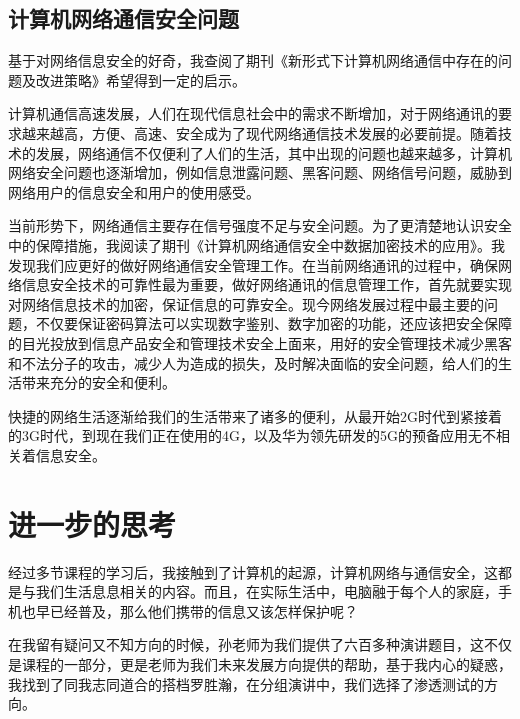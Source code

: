 \documentclass{article}
\begin{document}
\subsection{计算机网络通信安全问题}
基于对网络信息安全的好奇，我查阅了期刊《新形式下计算机网络通信中存在的问题及改进策略》\citep{A}希望得到一定的启示。\par
计算机通信高速发展，人们在现代信息社会中的需求不断增加，对于网络通讯的要求越来越高，方便、高速、安全成为了现代网络通信技术发展的必要前提。随着技术的发展，网络通信不仅便利了人们的生活，其中出现的问题也越来越多，计算机网络安全问题也逐渐增加，例如信息泄露问题、黑客问题、网络信号问题，威胁到网络用户的信息安全和用户的使用感受。\par
当前形势下，网络通信主要存在信号强度不足与安全问题。为了更清楚地认识安全中的保障措施，我阅读了期刊《计算机网络通信安全中数据加密技术的应用》\citep{B}。我发现我们应更好的做好网络通信安全管理工作。在当前网络通讯的过程中，确保网络信息安全技术的可靠性最为重要，做好网络通讯的信息管理工作，首先就要实现对网络信息技术的加密，保证信息的可靠安全。现今网络发展过程中最主要的问题，不仅要保证密码算法可以实现数字鉴别、数字加密的功能，还应该把安全保障的目光投放到信息产品安全和管理技术安全上面来，用好的安全管理技术减少黑客和不法分子的攻击，减少人为造成的损失，及时解决面临的安全问题，给人们的生活带来充分的安全和便利。\par
快捷的网络生活逐渐给我们的生活带来了诸多的便利，从最开始2G时代到紧接着的3G时代，到现在我们正在使用的4G，以及华为领先研发的5G的预备应用无不相关着信息安全。\par


\section{进一步的思考}
经过多节课程的学习后，我接触到了计算机的起源，计算机网络与通信安全，这都是与我们生活息息相关的内容。而且，在实际生活中，电脑融于每个人的家庭，手机也早已经普及，那么他们携带的信息又该怎样保护呢？\par
在我留有疑问又不知方向的时候，孙老师为我们提供了六百多种演讲题目，这不仅是课程的一部分，更是老师为我们未来发展方向提供的帮助，基于我内心的疑惑，我找到了同我志同道合的搭档罗胜瀚，在分组演讲中，我们选择了渗透测试的方向。\par
\end{document}

